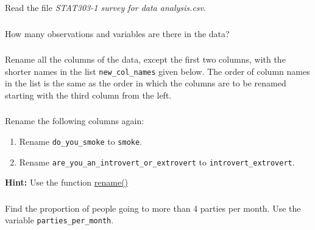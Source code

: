 \documentclass[
  letterpaper,
  DIV=11,
  numbers=noendperiod]{scrreprt}
\begin{document}
Read the file \emph{STAT303-1 survey for data analysis.csv}.

\hypertarget{section-27}{%
\subsubsection{}\label{section-27}}

How many observations and variables are there in the data?

\hypertarget{section-28}{%
\subsubsection{}\label{section-28}}

Rename all the columns of the data, except the first two columns, with
the shorter names in the list \texttt{new\_col\_names} given below. The
order of column names in the list is the same as the order in which the
columns are to be renamed starting with the third column from the left.

\hypertarget{section-29}{%
\subsubsection{}\label{section-29}}

Rename the following columns again:

\begin{enumerate}
\def\labelenumi{\arabic{enumi}.}
\item
  Rename \texttt{do\_you\_smoke} to \texttt{smoke}.
\item
  Rename \texttt{are\_you\_an\_introvert\_or\_extrovert} to
  \texttt{introvert\_extrovert}.
\end{enumerate}

\textbf{Hint:} Use the function
\href{https://pandas.pydata.org/docs/reference/api/pandas.DataFrame.rename.html}{rename()}

\hypertarget{section-30}{%
\subsubsection{}\label{section-30}}

Find the proportion of people going to more than 4 parties per month.
Use the variable \texttt{parties\_per\_month}.

\hypertarget{section-31}{%
\subsubsection{}\label{section-31}}
\end{document}
